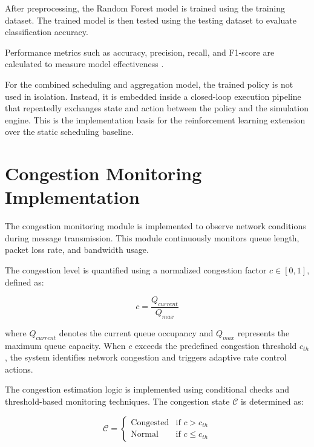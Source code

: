 After preprocessing, the Random Forest model is trained using 
the training dataset. The trained model is then tested using 
the testing dataset to evaluate classification accuracy.

Performance metrics such as accuracy, precision, recall, and 
F1-score are calculated to measure model effectiveness 
\cite{breiman2001randomforest}.

For the combined scheduling and aggregation model, the trained policy 
is not used in isolation. Instead, it is embedded inside a closed-loop 
execution pipeline that repeatedly exchanges state and action between 
the policy and the simulation engine. This is the implementation basis 
for the reinforcement learning extension over the static scheduling 
baseline.







\section{Congestion Monitoring Implementation}

The congestion monitoring module is implemented to observe network 
conditions during message transmission. This module continuously 
monitors queue length, packet loss rate, and bandwidth usage.

The congestion level is quantified using a normalized congestion 
factor $c \in [0, 1]$, defined as:

\begin{equation}
c = \frac{Q_{current}}{Q_{max}}
\label{eq:congestion_factor}
\end{equation}

\noindent where $Q_{current}$ denotes the current queue occupancy 
and $Q_{max}$ represents the maximum queue capacity. When $c$ 
exceeds the predefined congestion threshold $c_{th}$, the system 
identifies network congestion and triggers adaptive rate control 
actions.

The congestion estimation logic is implemented using conditional 
checks and threshold-based monitoring techniques. The congestion 
state $\mathcal{C}$ is determined as:

\begin{equation}
\mathcal{C} = 
\begin{cases}
\text{Congested} & \text{if } c > c_{th} \\
\text{Normal}    & \text{if } c \leq c_{th}
\end{cases}
\label{eq:congestion_state}
\end{equation}

